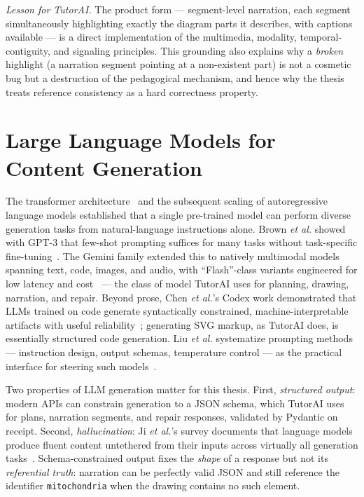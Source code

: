 \emph{Lesson for TutorAI.} The product form --- segment-level narration,
each segment simultaneously highlighting exactly the diagram parts it
describes, with captions available --- is a direct implementation of the
multimedia, modality, temporal-contiguity, and signaling principles. This
grounding also explains why a \emph{broken} highlight (a narration segment
pointing at a non-existent part) is not a cosmetic bug but a destruction of
the pedagogical mechanism, and hence why the thesis treats reference
consistency as a hard correctness property.

\section{Large Language Models for Content Generation}

The transformer architecture~\cite{vaswani2017attention} and the subsequent
scaling of autoregressive language models established that a single
pre-trained model can perform diverse generation tasks from natural-language
instructions alone. Brown \emph{et al.} showed with GPT-3 that few-shot
prompting suffices for many tasks without task-specific
fine-tuning~\cite{brown2020gpt3}. The Gemini family extended this to natively
multimodal models spanning text, code, images, and audio, with ``Flash''-class
variants engineered for low latency and cost~\cite{gemini2023} --- the class
of model TutorAI uses for planning, drawing, narration, and repair. Beyond
prose, Chen \emph{et al.}'s Codex work demonstrated that LLMs trained on code
generate syntactically constrained, machine-interpretable artifacts with
useful reliability~\cite{chen2021codex}; generating SVG markup, as TutorAI
does, is essentially structured code generation. Liu \emph{et al.}
systematize prompting methods --- instruction design, output schemas,
temperature control --- as the practical interface for steering such
models~\cite{liu2023promptsurvey}.

Two properties of LLM generation matter for this thesis. First,
\emph{structured output}: modern APIs can constrain generation to a JSON
schema, which TutorAI uses for plans, narration segments, and repair
responses, validated by Pydantic on receipt. Second, \emph{hallucination}: Ji
\emph{et al.}'s survey documents that language models produce fluent content
untethered from their inputs across virtually all generation
tasks~\cite{ji2023hallucination}. Schema-constrained output fixes the
\emph{shape} of a response but not its \emph{referential truth}: narration can
be perfectly valid JSON and still reference the identifier
\texttt{mitochondria} when the drawing contains no such element.

